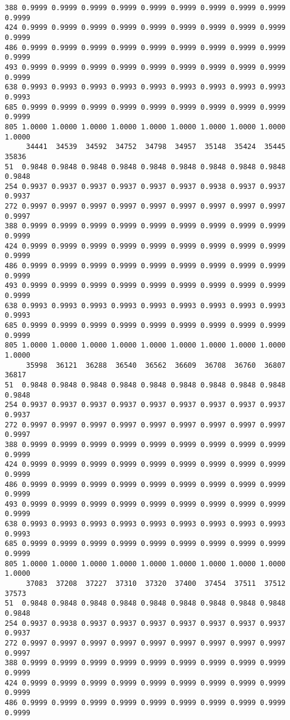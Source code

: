 \documentclass[
]{report}
\begin{document}
\begin{verbatim}
388 0.9999 0.9999 0.9999 0.9999 0.9999 0.9999 0.9999 0.9999 0.9999 0.9999
424 0.9999 0.9999 0.9999 0.9999 0.9999 0.9999 0.9999 0.9999 0.9999 0.9999
486 0.9999 0.9999 0.9999 0.9999 0.9999 0.9999 0.9999 0.9999 0.9999 0.9999
493 0.9999 0.9999 0.9999 0.9999 0.9999 0.9999 0.9999 0.9999 0.9999 0.9999
638 0.9993 0.9993 0.9993 0.9993 0.9993 0.9993 0.9993 0.9993 0.9993 0.9993
685 0.9999 0.9999 0.9999 0.9999 0.9999 0.9999 0.9999 0.9999 0.9999 0.9999
805 1.0000 1.0000 1.0000 1.0000 1.0000 1.0000 1.0000 1.0000 1.0000 1.0000
     34441  34539  34592  34752  34798  34957  35148  35424  35445  35836
51  0.9848 0.9848 0.9848 0.9848 0.9848 0.9848 0.9848 0.9848 0.9848 0.9848
254 0.9937 0.9937 0.9937 0.9937 0.9937 0.9937 0.9938 0.9937 0.9937 0.9937
272 0.9997 0.9997 0.9997 0.9997 0.9997 0.9997 0.9997 0.9997 0.9997 0.9997
388 0.9999 0.9999 0.9999 0.9999 0.9999 0.9999 0.9999 0.9999 0.9999 0.9999
424 0.9999 0.9999 0.9999 0.9999 0.9999 0.9999 0.9999 0.9999 0.9999 0.9999
486 0.9999 0.9999 0.9999 0.9999 0.9999 0.9999 0.9999 0.9999 0.9999 0.9999
493 0.9999 0.9999 0.9999 0.9999 0.9999 0.9999 0.9999 0.9999 0.9999 0.9999
638 0.9993 0.9993 0.9993 0.9993 0.9993 0.9993 0.9993 0.9993 0.9993 0.9993
685 0.9999 0.9999 0.9999 0.9999 0.9999 0.9999 0.9999 0.9999 0.9999 0.9999
805 1.0000 1.0000 1.0000 1.0000 1.0000 1.0000 1.0000 1.0000 1.0000 1.0000
     35998  36121  36288  36540  36562  36609  36708  36760  36807  36817
51  0.9848 0.9848 0.9848 0.9848 0.9848 0.9848 0.9848 0.9848 0.9848 0.9848
254 0.9937 0.9937 0.9937 0.9937 0.9937 0.9937 0.9937 0.9937 0.9937 0.9937
272 0.9997 0.9997 0.9997 0.9997 0.9997 0.9997 0.9997 0.9997 0.9997 0.9997
388 0.9999 0.9999 0.9999 0.9999 0.9999 0.9999 0.9999 0.9999 0.9999 0.9999
424 0.9999 0.9999 0.9999 0.9999 0.9999 0.9999 0.9999 0.9999 0.9999 0.9999
486 0.9999 0.9999 0.9999 0.9999 0.9999 0.9999 0.9999 0.9999 0.9999 0.9999
493 0.9999 0.9999 0.9999 0.9999 0.9999 0.9999 0.9999 0.9999 0.9999 0.9999
638 0.9993 0.9993 0.9993 0.9993 0.9993 0.9993 0.9993 0.9993 0.9993 0.9993
685 0.9999 0.9999 0.9999 0.9999 0.9999 0.9999 0.9999 0.9999 0.9999 0.9999
805 1.0000 1.0000 1.0000 1.0000 1.0000 1.0000 1.0000 1.0000 1.0000 1.0000
     37083  37208  37227  37310  37320  37400  37454  37511  37512  37573
51  0.9848 0.9848 0.9848 0.9848 0.9848 0.9848 0.9848 0.9848 0.9848 0.9848
254 0.9937 0.9938 0.9937 0.9937 0.9937 0.9937 0.9937 0.9937 0.9937 0.9937
272 0.9997 0.9997 0.9997 0.9997 0.9997 0.9997 0.9997 0.9997 0.9997 0.9997
388 0.9999 0.9999 0.9999 0.9999 0.9999 0.9999 0.9999 0.9999 0.9999 0.9999
424 0.9999 0.9999 0.9999 0.9999 0.9999 0.9999 0.9999 0.9999 0.9999 0.9999
486 0.9999 0.9999 0.9999 0.9999 0.9999 0.9999 0.9999 0.9999 0.9999 0.9999

\end{verbatim}
\end{document}
